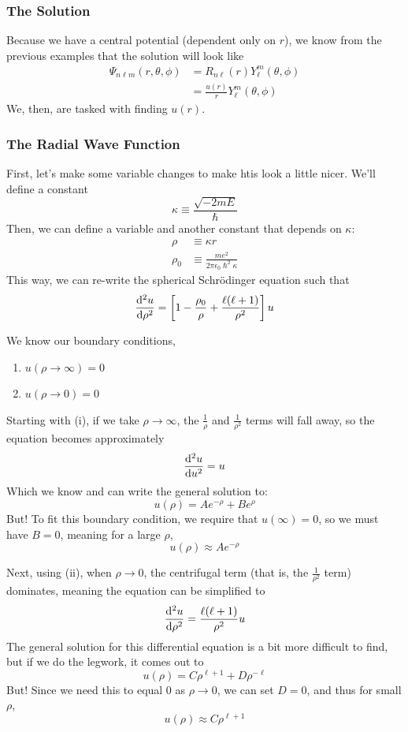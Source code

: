 \documentclass[a4paper]{article}
\begin{document}
\subsubsection{The Solution}
Because we have a central potential (dependent only on $r$), we know from
the previous examples that the solution will look like
\begin{align*}
	\Psi_{n\ell m}(r,\theta,\phi)&=R_{n\ell}(r)Y_\ell^m(\theta,\phi)\\
				     &=\frac{u(r)}{r}Y_\ell^m(\theta,\phi)
\end{align*}
We, then, are tasked with finding $u(r)$.

\subsubsection{The Radial Wave Function}
First, let's make some variable changes to make htis look a little nicer.
We'll define a constant \[ \kappa \equiv \frac{\sqrt{-2mE}}{\hslash} \]
Then, we can define a variable and another constant that depends on $\kappa$:
\begin{align*}
	\rho &\equiv \kappa r\\
	\rho_0 &\equiv \frac{me^2}{2\pi\epsilon_0\hslash^2\kappa}
\end{align*}
This way, we can re-write the spherical Schr\"odinger equation such that
\[ \frac{\mathrm{d} ^2u}{\mathrm{d} \rho^2}=
\left[1-\frac{\rho_0}{\rho}+\frac{\ell(\ell+1)}{\rho^2}\right] u \]

We know our boundary conditions,
\begin{enumerate}
	\item $u(\rho\to\infty) = 0$
	\item $u(\rho\to0) = 0$
\end{enumerate}

Starting with (i), if we take $\rho\to\infty$, the $\frac{1}{\rho}$ and
$\frac{1}{\rho^2}$ terms will fall away, so the equation becomes approximately
\[ \frac{\mathrm{d} ^2u}{\mathrm{d} u^2} = u \]
Which we know and can write the general solution to:
\[ u(\rho) = Ae^{-\rho} + Be^{\rho} \]
But! To fit this boundary condition, we require that $u(\infty)=0$, so
we must have $B=0$, meaning for a large $\rho$,
\[u(\rho) \approx Ae^{-\rho}\]

Next, using (ii), when $\rho\to0$, the centrifugal term (that is, the
$\frac{1}{\rho^2}$ term) dominates, meaning the equation can be simplified to
\[ \frac{\mathrm{d} ^2u}{\mathrm{d} \rho^2} = \frac{\ell(\ell+1)}{\rho^2}u \]
The general solution for this differential equation is a bit more difficult to
find, but if we do the legwork, it comes out to
\[ u(\rho) = C\rho^{\ell+1}+D\rho^{-\ell} \]
But! Since we need this to equal 0 as $\rho\to0$, we can set $D=0$, and thus
for small $\rho$,
\[ u(\rho) \approx C\rho^{\ell+1} \]
\end{document}
